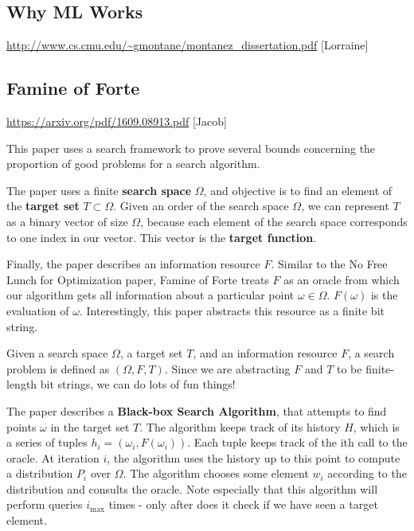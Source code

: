\documentclass[12pt]{article}
\begin{document}
\newpage

\subsection*{Why ML Works} 

\url{http://www.cs.cmu.edu/~gmontane/montanez_dissertation.pdf} [Lorraine]

\newpage


\subsection*{Famine of Forte} 

\url{https://arxiv.org/pdf/1609.08913.pdf} [Jacob]

This paper uses a search framework to prove several bounds concerning the proportion of good problems for a search algorithm. 

The paper uses a finite \textbf{search space} $\Omega$, and objective is to find an element of the \textbf{target set} $T \subset \Omega$. Given an order of the search space $\Omega$, we can represent $T$ as a binary vector of size $\Omega$, because each element of the search space corresponds to one index in our vector. This vector is the \textbf{target function}. 

Finally, the paper describes an information resource $F$. Similar to the No Free Lunch for Optimization paper, Famine of Forte treats $F$ as an oracle from which our algorithm gets all information about a particular point $\omega \in \Omega$. $F(\omega)$ is the evaluation of $\omega$. Interestingly, this paper abstracts this resource as a finite bit string. 

Given a search space $\Omega$, a target set $T$, and an information resource $F$, a search problem is defined as $(\Omega, F, T)$. Since we are abstracting $F$ and $T$ to be finite-length bit strings, we can do lots of fun things!

The paper describes a \textbf{Black-box Search Algorithm}, that attempts to find points $\omega$ in the target set $T$. The algorithm keeps track of its history $H$, which is a series of tuples $h_i = (\omega_i, F(\omega_i))$. Each tuple keeps track of the ith call to the oracle. At iteration $i$, the algorithm uses the history up to this point to compute a distribution $P_i$ over $\Omega$. The algorithm chooses some element $w_i$ according to the distribution and consults the oracle. Note especially that this algorithm will perform queries $i_{\text{max}}$ times - only after does it check if we have seen a target element.
\end{document}
